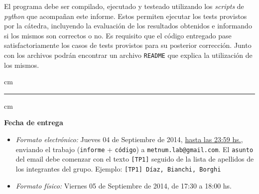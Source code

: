 \documentclass[11pt, a4paper]{article}
\begin{document}
El programa debe ser compilado, ejecutado y testeado utilizando los \emph{scripts} de \emph{python} que acompa\~nan este informe. Estos permiten ejecutar los tests provistos por la c\'atedra, incluyendo la evaluaci\'on de los resultados obtenidos e informando si los mismos son correctos o no. Es requisito que el c\'odigo entregado pase satisfactoriamente los casos de tests provistos para su posterior correcci\'on. Junto con los archivos podr\'an encontrar un archivo \texttt{README} que explica la utilizaci\'on de los mismos.

 cm
\hrule
{} cm

{\bf Fecha de entrega} 
\begin{itemize}
\item \textsl{Formato electr\'onico:} Jueves 04 de Septiembre de 2014, \underline{hasta las 23:59 hs.}, enviando el trabajo
(\texttt{informe} + \texttt{c\'odigo}) a \texttt{metnum.lab@gmail.com}. El \texttt{asunto} del email debe comenzar con el texto \verb|[TP1]| seguido
de la lista de apellidos de los integrantes del grupo. Ejemplo: \texttt{[TP1] D\'iaz, Bianchi, Borghi}
\item \textsl{Formato f\'isico:} Viernes 05 de Septiembre de 2014, de 17:30 a 18:00 hs.
\end{itemize}
\end{document}
